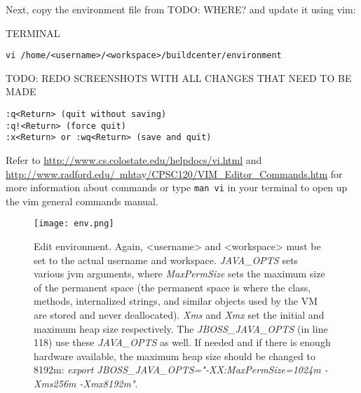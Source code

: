 \documentclass[10pt,a4paper]{article}
\begin{document}
\noindent
Next, copy the environment file from TODO: WHERE? and update it using vim:

\begin{command}{TERMINAL}
\begin{lstlisting}
vi /home/<username>/<workspace>/buildcenter/environment
\end{lstlisting}
 TODO: REDO SCREENSHOTS WITH ALL CHANGES THAT NEED TO BE MADE

\vspace{\baselineskip}

\noindent
{}
\begin{lstlisting}
:q<Return> (quit without saving)
:q!<Return> (force quit)
:x<Return> or :wq<Return> (save and quit)
\end{lstlisting}
\end{command}

\vspace{\baselineskip}

\tip{}Refer to \href{http://www.cs.colostate.edu/helpdocs/vi.html}{http://www.cs.colostate.edu/helpdocs/vi.html} and \newline \href{http://www.radford.edu/~mhtay/CPSC120/VIM\_Editor\_Commands.htm}{http://www.radford.edu/~mhtay/CPSC120/VIM\_Editor\_Commands.htm} for more information about commands or type \verb+man vi+ in your terminal to open up the vim general commands manual.

\begin{figure}[h!tp]
\begin{center}

\texttt{[image: env.png]}
%
\end{center}
%
\caption{Edit environment. Again, <username> and <workspace> must be set to the actual username and workspace. \textit{JAVA\_OPTS} sets various jvm arguments, where \textit{MaxPermSize} sets the maximum size of the permanent space (the permanent space is where the class, methods, internalized strings, and similar objects used by the VM are stored and never deallocated). \textit{Xms} and \textit{Xmx} set the initial and maximum heap size respectively. The \textit{JBOSS\_JAVA\_OPTS} (in line 118) use these \textit{JAVA\_OPTS} as well. If needed and if there is enough hardware available, the maximum heap size should be changed to 8192m: \textit{export JBOSS\_JAVA\_OPTS="-XX:MaxPermSize=1024m -Xms256m -Xmx8192m"}.}
\label{fig:env}
%
\end{figure}
\end{document}
